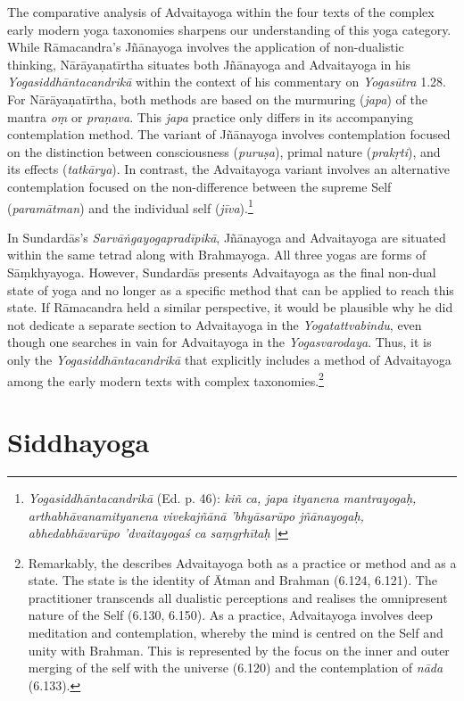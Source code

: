 The comparative analysis of Advaitayoga within the four texts of the complex early modern yoga taxonomies sharpens our understanding of this yoga category. While Rāmacandra’s Jñānayoga involves the application of non-dualistic thinking, Nārāyaṇatīrtha situates both Jñānayoga and Advaitayoga in his \textit{Yogasiddhāntacandrikā} within the context of his commentary on \textit{Yogasūtra} 1.28. For Nārāyaṇatīrtha, both methods are based on the murmuring (\textit{japa}) of the mantra \textit{oṃ} or \textit{praṇava}. This \textit{japa} practice only differs in its accompanying contemplation method. The variant of Jñānayoga involves contemplation focused on the distinction between consciousness (\textit{puruṣa}), primal nature (\textit{prakṛti}), and its effects (\textit{tatkārya}). In contrast, the Advaitayoga variant involves an alternative contemplation focused on the non-difference between the supreme Self (\textit{paramātman}) and the individual self (\textit{jīva}).\footnote{\emph{Yogasiddhāntacandrikā} (Ed. p. 46): \textit{kiñ ca, japa ityanena mantrayogaḥ, arthabhāvanamityanena vivekajñānā 'bhyāsarūpo jñānayogaḥ, abhedabhāvarūpo 'dvaitayogaś ca saṃgṛhītaḥ} |}

In Sundardās’s \textit{Sarvāṅgayogapradīpikā}, Jñānayoga and Advaitayoga are situated within the same tetrad along with Brahmayoga. All three yogas are forms of Sāṃkhyayoga. However, Sundardās presents Advaitayoga as the final non-dual state of yoga and no longer as a specific method that can be applied to reach this state. If Rāmacandra held a similar perspective, it would be plausible why he did not dedicate a separate section to Advaitayoga in the \textit{Yogatattvabindu}, even though one searches in vain for Advaitayoga in the \textit{Yogasvarodaya}. Thus, it is only the \textit{Yogasiddhāntacandrikā} that explicitly includes a method of Advaitayoga among the early modern texts with complex taxonomies.\footnote{Remarkably, the  describes Advaitayoga both as a practice or method and as a state. The state is the identity of Ātman and Brahman (6.124, 6.121). The practitioner transcends all dualistic perceptions and realises the omnipresent nature of the Self (6.130, 6.150). As a practice, Advaitayoga involves deep meditation and contemplation, whereby the mind is centred on the Self and unity with Brahman. This is represented by the focus on the inner and outer merging of the self with the universe (6.120) and the contemplation of \textit{nāda} (6.133).}   

\section{Siddhayoga}
\label{siddhayogaintro}

